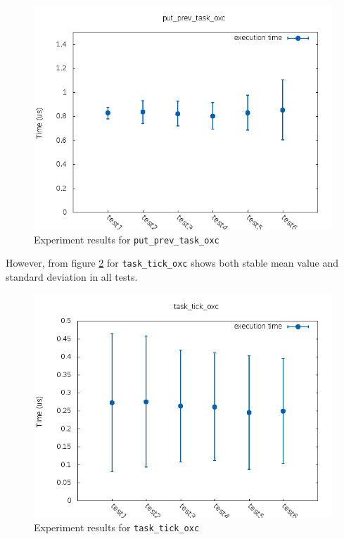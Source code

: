 \begin{figure}[h!]%
        \centering
        \includegraphics[width=\textwidth]{images/put_prev_task_oxc}
        \caption{Experiment results for \texttt{put\_prev\_task\_oxc}}
        \label{fig:put_prev}
\end{figure}
However, from figure \ref{fig:task_tick} for \texttt{task\_tick\_oxc} shows
both stable mean value and standard deviation in all tests.
\begin{figure}[h!]%
        \centering
        \includegraphics[width=\textwidth]{images/task_tick_oxc}
        \caption{Experiment results for \texttt{task\_tick\_oxc}}
        \label{fig:task_tick}
\end{figure}


